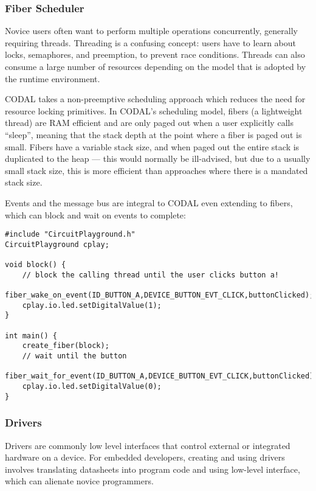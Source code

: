 
\subsubsection{Fiber Scheduler}

Novice users often want to perform multiple operations concurrently, generally requiring threads. Threading is a confusing concept: users have to learn about locks, semaphores, and preemption, to prevent race conditions. Threads can also consume a large number of resources depending on the model that is adopted by the runtime environment.

CODAL takes a non-preemptive scheduling approach which reduces the need for resource locking primitives. In CODAL's scheduling model, fibers (a lightweight thread) are RAM efficient and are only paged out when a user explicitly calls ``sleep'', meaning that the stack depth at the point where a fiber is paged out is small. Fibers have a variable stack size, and when paged out the entire stack is duplicated to the heap --- this would normally be ill-advised, but due to a usually small stack size, this is more efficient than approaches where there is a mandated stack size.

Events and the message bus are integral to CODAL even extending to fibers, which can block and wait on events to complete:

\begin{lstlisting}
#include "CircuitPlayground.h"
CircuitPlayground cplay;

void block() {
    // block the calling thread until the user clicks button a!
    fiber_wake_on_event(ID_BUTTON_A,DEVICE_BUTTON_EVT_CLICK,buttonClicked);
    cplay.io.led.setDigitalValue(1);
}

int main() {
    create_fiber(block);
    // wait until the button
    fiber_wait_for_event(ID_BUTTON_A,DEVICE_BUTTON_EVT_CLICK,buttonClicked);
    cplay.io.led.setDigitalValue(0);
}
\end{lstlisting}

\subsubsection{Drivers}

Drivers are commonly low level interfaces that control external or integrated hardware on a device. For embedded developers, creating and using drivers involves translating datasheets into program code and using low-level interface, which can alienate novice programmers.

